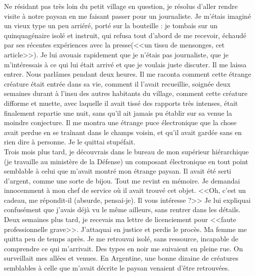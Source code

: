 \documentclass[11pt,twoside,a4paper]{article}
\begin{document}
\begin{minipage}[ht]{0.75\textwidth}
\begin{cursive}
Ne r{\'e}sidant pas tr{\`e}s loin du petit village en question, je r{\'e}solus d'aller rendre visite {\`a} notre paysan en me faisant passer pour un journaliste. Je m'{\'e}tais imagin{\'e} un vieux type un peu arri{\'e}r{\'e}, port{\'e} sur la bouteille : je tombais sur un quinquag{\'e}naire isol{\'e} et instruit, qui refusa tout d'abord de me recevoir, {\'e}chaud{\'e} par ses r{\'e}centes exp{\'e}riences avec la presse(<<un tissu de mensonges, cet article>>). Je lui avouais rapidement que je n'{\'e}tais pas journaliste, que je m'int{\'e}ressais {\`a} ce qui lui {\'e}tait arriv{\'e} et que je voulais juste discuter. Il me laissa entrer. Nous parl{\^a}mes pendant deux heures. Il me raconta comment cette {\'e}trange cr{\'e}ature {\'e}tait entr{\'e}e dans sa vie, comment il l'avait recueillie, soign{\'e}e deux semaines durant {\`a} l'insu des autres habitants du village, comment cette cr{\'e}ature difforme et muette, avec laquelle il avait tiss{\'e} des rapports tr{\`e}s intenses, {\'e}tait finalement repartie une nuit, sans qu'il ait jamais pu {\'e}tablir sur sa venue la moindre conjecture. Il me montra une {\'e}trange puce {\'e}lectronique que la chose avait perdue en se tra{\^i}nant dans le champs voisin, et qu'il avait gard{\'e}e sans en rien dire {\`a} personne. Je le quittai stup{\'e}fait. ~\\

Trois mois plus tard, je d{\'e}couvrais dans le bureau de mon sup{\'e}rieur hi{\'e}rarchique (je travaille au minist{\`e}re de la D{\'e}fense) un composant {\'e}lectronique en tout point semblable {\`a} celui que m'avait montr{\'e} mon {\'e}trange paysan. Il avait {\'e}t{\'e} serti d'argent, comme une sorte de bijou. Tout me revint en m{\'e}moire. Je demandai innocemment {\`a} mon chef de service o{\`u} il avait trouv{\'e} cet objet. <<Oh, c'est un cadeau, me r{\'e}pondit-il (absurde, pensai-je). Il vous int{\'e}resse ?>> Je lui expliquai confus{\'e}ment que j'avais d{\'e}j{\`a} vu le m{\^e}me ailleurs, sans rentrer dans les d{\'e}tails. ~\\

Deux semaines plus tard, je recevais ma lettre de licenciement pour <<faute professionnelle grave>>. J'attaquai en justice et perdis le proc{\`e}s. Ma femme me quitta peu de temps apr{\`e}s. Je me retrouvai isol{\'e}, sans ressource, incapable de comprendre ce qui m'arrivait. Des types en noir me suivaient en pleine rue. On surveillait mes all{\'e}es et venues. En Argentine, une bonne dizaine de cr{\'e}atures semblables {\`a} celle que m'avait d{\'e}crite le paysan venaient d'{\^e}tre retrouv{\'e}es. ~\\


\end{cursive}
\end{minipage}
\end{document}
